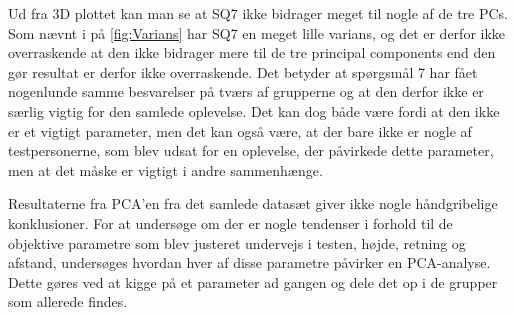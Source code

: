 \noindent
%
Ud fra 3D plottet kan man se at SQ7 ikke bidrager meget til nogle af de tre PCs. Som nævnt i  på \autoref{fig:Varians} har SQ7 en meget lille varians, og det er derfor ikke overraskende at den ikke bidrager mere til de tre principal components end den gør resultat er derfor ikke overraskende. Det betyder at spørgsmål 7 har fået nogenlunde samme besvarelser på tværs af grupperne og at den derfor ikke er særlig vigtig for den samlede oplevelse. Det kan dog både være fordi at den ikke er et vigtigt parameter, men det kan også være, at der bare ikke er nogle af testpersonerne, som blev udsat for en oplevelse, der påvirkede dette parameter, men at det måske er vigtigt i andre sammenhænge. 

Resultaterne fra PCA'en fra det samlede datasæt giver ikke nogle håndgribelige konklusioner. For at undersøge om der er nogle tendenser i forhold til de objektive parametre som blev justeret undervejs i testen, højde, retning og afstand, undersøges hvordan hver af disse parametre påvirker en PCA-analyse. Dette gøres ved at kigge på et parameter ad gangen og dele det op i de grupper som allerede findes.